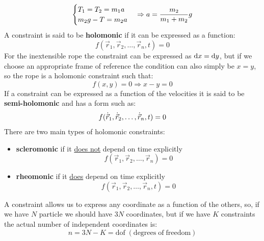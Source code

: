 \begin{equation}
    \centering
\begin{cases}
T_1=T_2=m_1a \\
m_2g -T =m_2a \\
\end{cases} \Rightarrow a = \dfrac{m_2}{m_1+m_2}g
\end{equation}
A constraint is said to be \textbf{holomonic} if it can be expressed as a function:
\begin{equation}
    f(\vec{r}_1,\vec{r}_2,\dots,\vec{r}_n,t) = 0
\end{equation}
For the inextensible rope the constraint can be expressed as $\mathrm{d}x=\mathrm{d}y$, but if we choose an appropriate frame of reference the condition can also simply be $x=y$, so the rope is a holomonic constraint such that:
\begin{equation}
    f(x,y)=0 \Rightarrow x-y=0
\end{equation}
If a constraint can be expressed as a function of the velocities it is said to be \textbf{semi-holomonic} and has a form such as:
\begin{equation}
    f(\dot{\vec{r}}_1,\dot{\vec{r}}_2,\dots,\dot{\vec{r}}_n,t) = 0
\end{equation}
There are two main types of holomonic constraints:
\begin{itemize}
    \item \textbf{scleromonic} if it \underline{does not} depend on time explicitly \[f(\vec{r}_1,\vec{r}_2,\dots,\vec{r}_n) = 0\]
    \item \textbf{rheomonic} if it \underline{does} depend on time explicitly \[f(\vec{r}_1,\vec{r}_2,\dots,\vec{r}_n,t) = 0\]
\end{itemize}
A constraint allows us to express any coordinate as a function of the others, so, if we have $N$ particle we should have $3N$ coordinates, but if we have $K$ constraints the actual number of independent coordinates is:
\begin{equation}
    n = 3N-K = \mathrm{dof\;(degrees\;of\;freedom)}
\end{equation}

